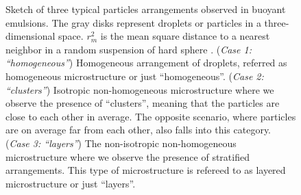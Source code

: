 \begin{figure}[h!]
\begin{tikzpicture}
\end{tikzpicture}
\hfill
\caption{Sketch of three typical particles arrangements observed in buoyant emulsions.
The gray disks represent droplets or particles in a three-dimensional space. 
$r_m^2$ is the mean square distance to a nearest neighbor in a random suspension of hard sphere \citep{zhang2023evolution,fintzi2024buoyancy}.  
(\textit{Case 1: ``homogeneous''}) Homogeneous arrangement of droplets, referred as homogeneous microstructure or just ``homogeneous''.
(\textit{Case 2: ``clusters''}) Isotropic non-homogeneous microstructure where we  observe the presence of ``clusters'', meaning that the particles are close to each other in average.
The opposite scenario, where particles are on average far from each other, also falls into this category. 
(\textit{Case 3: ``layers''}) The non-isotropic non-homogeneous microstructure where we observe the presence of stratified arrangements.
This type of microstructure is refereed to as layered microstructure or just ``layers''. 
}
\label{fig:scheme_clusters}
\end{figure}
